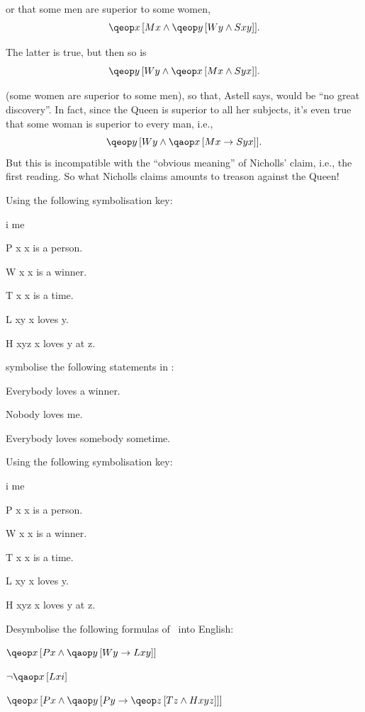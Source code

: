 \documentclass[PHIL101-Textbook.tex]{subfiles}
\begin{document}
or that some men are superior to some women,
$$\qeb{x}{\atom M x  \eand \qeb{y}{\atom W y \eand \atom S xy }}.$$

The latter is true, but then so is
$$\qeb{y}{\atom W y \eand \qeb{x}{\atom M x  \eand \atom S yx}}.$$

(some women are superior to some men), so that, Astell says,  would be ``no great discovery''.  In fact, since the Queen is superior to all her subjects, it's even true that some woman is superior to every man, i.e.,
$$
\qeb{y}{\atom W y \land \qab{x}{\atom M x  \eif \atom S yx}}.$$
But this is incompatible with the ``obvious meaning'' of Nicholls' claim, i.e., the first reading. So what Nicholls claims amounts to treason against the Queen!


\pagebreak
\practiceproblems
\problempart
\label{pr.love1}
Using the following symbolisation key:
\begin{ekey}
\item[i] me
\item[\atom P x ] x is a person.
\item[\atom W x ] x is a winner.
\item[\atom T x ] x is a time.
\item[\atom L xy ] x loves y.
\item[\atom H xyz] x loves y at z.
\end{ekey}

\noindent symbolise the following statements in \pl:
\begin{earg}
\item Everybody loves a winner. 
\item Nobody loves me. 
\item Everybody loves somebody sometime. 
\end{earg}


\problempart
\label{pr.love2}
Using the following symbolisation key:
\begin{ekey}
\item[i] me
\item[\atom P x ] x is a person.
\item[\atom W x ] x is a winner.
\item[\atom T x ] x is a time.
\item[\atom L xy ] x loves y.
\item[\atom H xyz] x loves y at z.
\end{ekey}

\noindent Desymbolise the following formulas of \pl\ into English: 
\begin{earg}
\item $\qeb{x}{\atom P x \eand \qab{y}{\atom W y \eif \atom L  xy }}$
\item $\enot \qab{x}{ \atom L xi}$
\item $\qeb{x}{\atom P x \eand \qab{y}{\atom P y \eif \qeb{z}{\atom T z \eand \atom H xyz}}}$ 
\end{earg}
\end{document}
